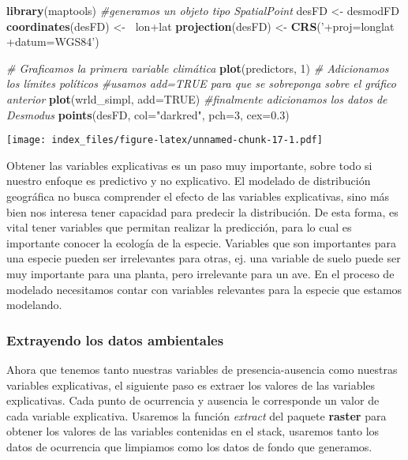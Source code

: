\documentclass[]{article}
\newenvironment{Shaded}{\begin{snugshade}}{\end{snugshade}}
\newcommand{\KeywordTok}[1]{\textcolor[rgb]{0.13,0.29,0.53}{\textbf{{#1}}}}
\newcommand{\DataTypeTok}[1]{\textcolor[rgb]{0.13,0.29,0.53}{{#1}}}
\newcommand{\DecValTok}[1]{\textcolor[rgb]{0.00,0.00,0.81}{{#1}}}
\newcommand{\FloatTok}[1]{\textcolor[rgb]{0.00,0.00,0.81}{{#1}}}
\newcommand{\StringTok}[1]{\textcolor[rgb]{0.31,0.60,0.02}{{#1}}}
\newcommand{\CommentTok}[1]{\textcolor[rgb]{0.56,0.35,0.01}{\textit{{#1}}}}
\newcommand{\OtherTok}[1]{\textcolor[rgb]{0.56,0.35,0.01}{{#1}}}
\newcommand{\ErrorTok}[1]{\textcolor[rgb]{0.64,0.00,0.00}{\textbf{{#1}}}}
\newcommand{\NormalTok}[1]{{#1}}
\begin{document}
\begin{Shaded}
\begin{Highlighting}[]
\KeywordTok{library}\NormalTok{(maptools)}
\CommentTok{#generamos un objeto tipo SpatialPoint}
\NormalTok{desFD <-}\StringTok{ }\NormalTok{desmodFD}
\KeywordTok{coordinates}\NormalTok{(desFD) <-}\StringTok{ }\ErrorTok{~}\NormalTok{lon+lat}
\KeywordTok{projection}\NormalTok{(desFD) <-}\StringTok{ }\KeywordTok{CRS}\NormalTok{(}\StringTok{'+proj=longlat +datum=WGS84'}\NormalTok{)}

\CommentTok{# Graficamos la primera variable climática}
\KeywordTok{plot}\NormalTok{(predictors, }\DecValTok{1}\NormalTok{)}
\CommentTok{# Adicionamos los límites políticos}
\CommentTok{#usamos add=TRUE para que se sobreponga sobre el gráfico anterior}
\KeywordTok{plot}\NormalTok{(wrld_simpl, }\DataTypeTok{add=}\OtherTok{TRUE}\NormalTok{)}
\CommentTok{#finalmente adicionamos los datos de Desmodus}
\KeywordTok{points}\NormalTok{(desFD, }\DataTypeTok{col=}\StringTok{"darkred"}\NormalTok{, }\DataTypeTok{pch=}\DecValTok{3}\NormalTok{, }\DataTypeTok{cex=}\FloatTok{0.3}\NormalTok{)}
\end{Highlighting}
\end{Shaded}

\texttt{[image: index\_files/figure-latex/unnamed-chunk-17-1.pdf]}

Obtener las variables explicativas es un paso muy importante, sobre todo
si nuestro enfoque es predictivo y no explicativo. El modelado de
distribución geográfica no busca comprender el efecto de las variables
explicativas, sino más bien nos interesa tener capacidad para predecir
la distribución. De esta forma, es vital tener variables que permitan
realizar la predicción, para lo cual es importante conocer la ecología
de la especie. Variables que son importantes para una especie pueden ser
irrelevantes para otras, ej. una variable de suelo puede ser muy
importante para una planta, pero irrelevante para un ave. En el proceso
de modelado necesitamos contar con variables relevantes para la especie
que estamos modelando.

\subsubsection{Extrayendo los datos
ambientales}\label{extrayendo-los-datos-ambientales}

Ahora que tenemos tanto nuestras variables de presencia-ausencia como
nuestras variables explicativas, el siguiente paso es extraer los
valores de las variables explicativas. Cada punto de ocurrencia y
ausencia le corresponde un valor de cada variable explicativa. Usaremos
la función \emph{extract} del paquete \textbf{raster} para obtener los
valores de las variables contenidas en el stack, usaremos tanto los
datos de ocurrencia que limpiamos como los datos de fondo que generamos.
\end{document}
